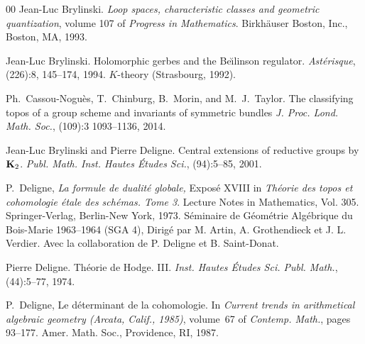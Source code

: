 \documentclass{amsart}
\numberwithin{equation}{subsection}
\theoremstyle{remark}
\theoremstyle{remark}
\begin{document}
\begin{thebibliography}{00}
 Jean-Luc Brylinski.
\newblock \emph{Loop spaces, characteristic classes and geometric quantization},
  volume 107 of \emph{Progress in Mathematics}.
\newblock Birkh\"auser Boston, Inc., Boston, MA, 1993.
 
 Jean-Luc Brylinski.
\newblock Holomorphic gerbes and the {B}e\u\i linson regulator.
\newblock \emph{Ast\'erisque}, (226):8, 145--174, 1994.
\newblock $K$-theory (Strasbourg, 1992).

  Ph.\ Cassou-Nogu{\`e}s, T.\ Chinburg, B.\ Morin, and M.\ J.\ Taylor.
  \newblock The classifying topos of a group scheme and invariants of symmetric  bundles
  \newblock \emph{J. Proc. Lond. Math. Soc.}, (109):3 1093--1136, 2014.

 Jean-Luc Brylinski and Pierre Deligne.
\newblock Central extensions of reductive groups by {$\bold K_2$}.
\newblock \emph{Publ. Math. Inst. Hautes \'Etudes Sci.}, (94):5--85, 2001.

 P.~Deligne, \newblock \emph{La formule de dualit\'e globale,} 
\newblock Expos\'e  XVIII in 
\newblock \emph{Th\'eorie des topos et cohomologie \'etale des sch\'emas. {T}ome 3}.
\newblock Lecture Notes in Mathematics, Vol. 305. Springer-Verlag, Berlin-New
  York, 1973.
\newblock S{\'e}minaire de G{\'e}om{\'e}trie Alg{\'e}brique du Bois-Marie
  1963--1964 (SGA 4), Dirig{\'e} par M. Artin, A. Grothendieck et J. L.
  Verdier. Avec la collaboration de P. Deligne et B. Saint-Donat.


  Pierre Deligne.
\newblock Th\'eorie de {H}odge. {III}.
\newblock \emph{Inst. Hautes \'Etudes Sci. Publ. Math.}, (44):5--77, 1974.

 P.~Deligne, \newblock Le d\'eterminant de la cohomologie.
\newblock In \emph{Current trends in arithmetical algebraic geometry ({A}rcata,
  {C}alif., 1985)}, volume~67 of \emph{Contemp. Math.}, pages 93--177. Amer.
  Math. Soc., Providence, RI, 1987.



\end{thebibliography}
\end{document}
